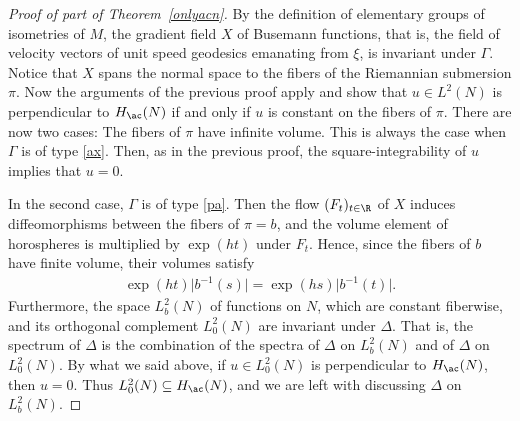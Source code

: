 \begin{proof}[Proof of part of Theorem~\ref{onlyacn}]
By the definition of elementary groups of isometries of $M$, the gradient field $X$ of Busemann functions,
that is, the field of velocity vectors of unit speed geodesics emanating from $\xi$,
is invariant under $\Gamma$.
Notice that $X$ spans the normal space to the fibers of the Riemannian submersion $\pi$.
Now the arguments of the previous proof apply and show that $u\in L^2(N)$ is perpendicular to $H_{\ac}(N)$
if and only if $u$ is constant on the fibers of $\pi$.
There are now two cases:
The fibers of $\pi$ have infinite volume.
This is always the case when $\Gamma$ is of type \ref{ax}.
Then, as in the previous proof, the square-integrability of $u$ implies that $u=0$.

In the second case, $\Gamma$ is of type \ref{pa}.
Then the flow $(F_t)_{t\in\R}$ of $X$ induces diffeomorphisms between the fibers of $\pi=b$,
and the volume element of horospheres is multiplied by $\exp(ht)$ under $F_t$.
Hence, since the fibers of $b$ have finite volume, their volumes satisfy
\begin{align*}
	\exp(ht) \big|b^{-1}(s)\big| = \exp(hs) \big|b^{-1}(t)\big|.
\end{align*}
Furthermore, the space $L^2_b(N)$ of functions on $N$, which are constant fiberwise,
and its orthogonal complement $L^2_0(N)$ are invariant under $\Delta$.
That is, the spectrum of $\Delta$ is the combination of the spectra of $\Delta$ on $L^2_b(N)$
and of $\Delta$ on $L^2_0(N)$.
By what we said above, if $u\in L^2_0(N)$ is perpendicular to $H_{\ac}(N)$, then $u=0$.
Thus $L^2_0(N)\subseteq H_{\ac}(N)$, and we are left with discussing $\Delta$ on $L^2_b(N)$.


\end{proof}
